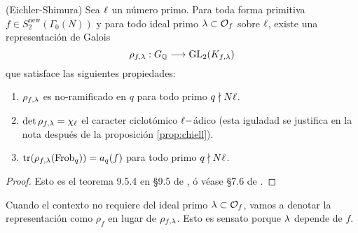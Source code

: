 \begin{thm}\label{thm:eichlershimura}(Eichler-Shimura)
  Sea $\ell$ un n\'umero primo. Para toda forma primitiva $f\in S^{\mathrm{new}}_2(\Gamma_0(N))$  y  para  todo ideal primo $\lambda\subset\mathcal{O}_f$ sobre $\ell$, existe una representaci\'on de Galois
  \[
    \rho_{f,\lambda}:G_{\mathbb{Q}}\longrightarrow\mathrm{GL}_2(K_{f,\lambda})
  \]
  que satisface las siguientes propiedades:
  \begin{enumerate}[label=\roman*)]
  \item $\rho_{f,\lambda}$ es no-ramificado en $q$ para todo primo $q\nmid N\ell$.
  \item\label{es_uno} $\det\rho_{f,\lambda}=\chi_{\ell}$ el caracter ciclot\'omico $\ell-$\'adico (esta iguladad se justifica en la nota despu\'es de la proposici\'on \ref{prop:chiell}).
  \item $\mathrm{tr}(\rho_{f,\lambda}(\mathrm{Frob}_q))=a_q(f)$ para todo primo $q\nmid N\ell$.
  \end{enumerate}
\end{thm}


\begin{proof}
  Esto es el teorema 9.5.4 en \S 9.5 de \cite{DiamondShurmanAFCIMF}, \'o v\'ease \S 7.6 de \cite{ShimuraITTATOAF}.
\end{proof}

\begin{nota}
	Cuando el contexto no requiere del ideal primo $\lambda\subset\mathcal{O}_f$, vamos a denotar la representación como $\rho_f$ en lugar de $\rho_{f,\lambda}$. Esto es sensato porque $\lambda$ depende de $f$.
\end{nota}


